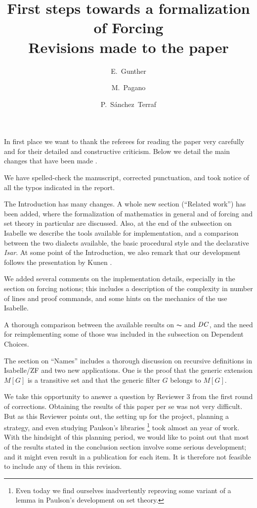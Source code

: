 \documentclass[11pt,english]{article}
\begin{document}
\title{First steps towards a formalization of Forcing
  \\ Revisions made to the paper}
\author{E.~Gunther \and  M.~Pagano \and P.~S\'anchez~Terraf
}
\date{}
\maketitle

In first place we want to thank the referees for reading the paper very
carefully and for their detailed and constructive criticism. Below we
detail the main changes that have been made%
.

We have spelled-check the manuscript, corrected punctuation, and took
notice of all the typos indicated in the report. 

The Introduction has many changes. A whole new section (``Related
work'') has been added, where the formalization of mathematics in
general and of forcing and set theory in particular are discussed.
Also, at the end of the subsection on Isabelle we describe the tools
available for implementation, and a comparison
between the two dialects available, the basic procedural style and the
declarative \emph{Isar}. At some point of the Introduction, we also
remark that our 
development follows the presentation by Kunen \cite{kunen2011set}. 

We added several comments on the implementation details, especially in
the section on forcing notions; this includes a description of the
complexity in number of lines and proof commands, and some hints on
the mechanics of the use Isabelle.

A thorough comparison between the available results on $\AC$ and
$\mathit{DC}$, and the need for reimplementing some of those was included in
the subsection on Dependent Choices.

The section on ``Names'' includes a thorough discussion on recursive
definitions in Isabelle/ZF and two new applications. One is the proof
that the generic extension $M[G]$ is a transitive set and that the
generic filter $G$ belongs to $M[G]$.

We take this opportunity to answer a question by Reviewer 3 from the
first round of corrections. Obtaining the results of this paper per se
was not very difficult. But as this Reviewer points out, the setting
up for the project, planning a strategy, and even studying Paulson's
libraries%
\footnote{Even today we find ourselves inadvertently reproving some
  variant of a lemma in Paulson's development on set theory.}
took almost an year of work. With the hindsight of this planning
period, we would like to point out that most of the results stated in
the conclusion section involve some serious development; and it might
even result in a publication for each item. It is therefore not
feasible to include any of them in this revision.
%
%


\end{document}
